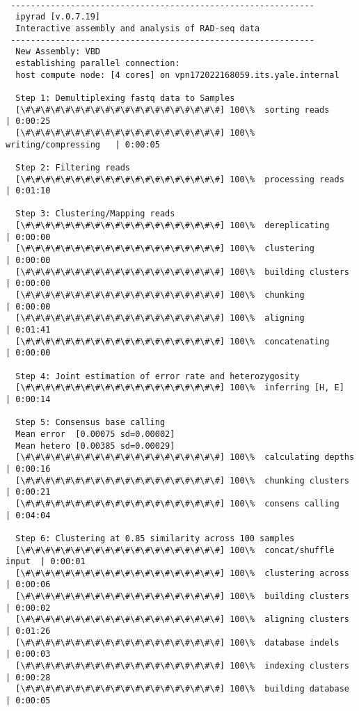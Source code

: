 \documentclass[11pt]{article}
\begin{document}
    \begin{Verbatim}[commandchars=\\\{\},fontsize=\footnotesize]

 -------------------------------------------------------------
  ipyrad [v.0.7.19]
  Interactive assembly and analysis of RAD-seq data
 -------------------------------------------------------------
  New Assembly: VBD
  establishing parallel connection:
  host compute node: [4 cores] on vpn172022168059.its.yale.internal

  Step 1: Demultiplexing fastq data to Samples
  [\#\#\#\#\#\#\#\#\#\#\#\#\#\#\#\#\#\#\#\#] 100\%  sorting reads         | 0:00:25
  [\#\#\#\#\#\#\#\#\#\#\#\#\#\#\#\#\#\#\#\#] 100\%  writing/compressing   | 0:00:05

  Step 2: Filtering reads
  [\#\#\#\#\#\#\#\#\#\#\#\#\#\#\#\#\#\#\#\#] 100\%  processing reads      | 0:01:10

  Step 3: Clustering/Mapping reads
  [\#\#\#\#\#\#\#\#\#\#\#\#\#\#\#\#\#\#\#\#] 100\%  dereplicating         | 0:00:00
  [\#\#\#\#\#\#\#\#\#\#\#\#\#\#\#\#\#\#\#\#] 100\%  clustering            | 0:00:00
  [\#\#\#\#\#\#\#\#\#\#\#\#\#\#\#\#\#\#\#\#] 100\%  building clusters     | 0:00:00
  [\#\#\#\#\#\#\#\#\#\#\#\#\#\#\#\#\#\#\#\#] 100\%  chunking              | 0:00:00
  [\#\#\#\#\#\#\#\#\#\#\#\#\#\#\#\#\#\#\#\#] 100\%  aligning              | 0:01:41
  [\#\#\#\#\#\#\#\#\#\#\#\#\#\#\#\#\#\#\#\#] 100\%  concatenating         | 0:00:00

  Step 4: Joint estimation of error rate and heterozygosity
  [\#\#\#\#\#\#\#\#\#\#\#\#\#\#\#\#\#\#\#\#] 100\%  inferring [H, E]      | 0:00:14

  Step 5: Consensus base calling
  Mean error  [0.00075 sd=0.00002]
  Mean hetero [0.00385 sd=0.00029]
  [\#\#\#\#\#\#\#\#\#\#\#\#\#\#\#\#\#\#\#\#] 100\%  calculating depths    | 0:00:16
  [\#\#\#\#\#\#\#\#\#\#\#\#\#\#\#\#\#\#\#\#] 100\%  chunking clusters     | 0:00:21
  [\#\#\#\#\#\#\#\#\#\#\#\#\#\#\#\#\#\#\#\#] 100\%  consens calling       | 0:04:04

  Step 6: Clustering at 0.85 similarity across 100 samples
  [\#\#\#\#\#\#\#\#\#\#\#\#\#\#\#\#\#\#\#\#] 100\%  concat/shuffle input  | 0:00:01
  [\#\#\#\#\#\#\#\#\#\#\#\#\#\#\#\#\#\#\#\#] 100\%  clustering across     | 0:00:06
  [\#\#\#\#\#\#\#\#\#\#\#\#\#\#\#\#\#\#\#\#] 100\%  building clusters     | 0:00:02
  [\#\#\#\#\#\#\#\#\#\#\#\#\#\#\#\#\#\#\#\#] 100\%  aligning clusters     | 0:01:26
  [\#\#\#\#\#\#\#\#\#\#\#\#\#\#\#\#\#\#\#\#] 100\%  database indels       | 0:00:03
  [\#\#\#\#\#\#\#\#\#\#\#\#\#\#\#\#\#\#\#\#] 100\%  indexing clusters     | 0:00:28
  [\#\#\#\#\#\#\#\#\#\#\#\#\#\#\#\#\#\#\#\#] 100\%  building database     | 0:00:05


\end{Verbatim}
\end{document}
